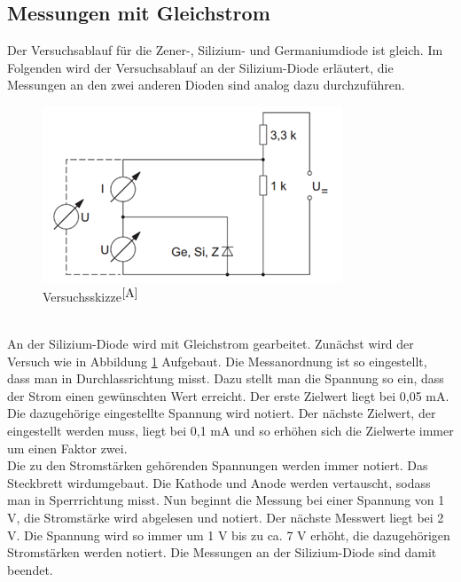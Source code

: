 \documentclass[fontsize=12pt]{scrartcl}
\begin{document}
\subsection{Messungen mit Gleichstrom}
Der Versuchsablauf für die Zener-, Silizium- und Germaniumdiode ist gleich. Im Folgenden wird der Versuchsablauf an der Silizium-Diode erläutert, die 
Messungen an den zwei anderen Dioden sind analog dazu durchzuführen. 
\begin{figure}[h!]
\centering
\includegraphics[scale=1]{Graphik/Versuch1}
\caption{Versuchsskizze$^{\cite{A}}$}
\label{1}
\end{figure}\\
An der Silizium-Diode wird mit Gleichstrom gearbeitet. Zunächst wird der Versuch wie in Abbildung \ref{1} Aufgebaut. Die Messanordnung ist so eingestellt, 
dass man in Durchlassrichtung misst. Dazu stellt man die Spannung so ein, dass der Strom einen gewünschten Wert erreicht. Der erste Zielwert liegt bei 0,05 
mA. Die dazugehörige eingestellte Spannung wird notiert. Der nächste Zielwert, der eingestellt werden muss, liegt bei 0,1 mA und so erhöhen sich die 
Zielwerte immer um einen Faktor zwei. \\
\noindent
Die zu den Stromstärken gehörenden Spannungen werden immer notiert. Das Steckbrett wirdumgebaut. Die Kathode und Anode werden vertauscht, sodass 
man in Sperrrichtung misst. Nun beginnt die Messung bei einer Spannung von 1 V, die Stromstärke wird abgelesen und notiert. Der nächste Messwert liegt 
bei 2 V. Die Spannung wird so immer um 1 V bis zu ca. 7 V erhöht, die dazugehörigen Stromstärken werden notiert.
Die Messungen an der Silizium-Diode sind damit beendet.
\end{document}
